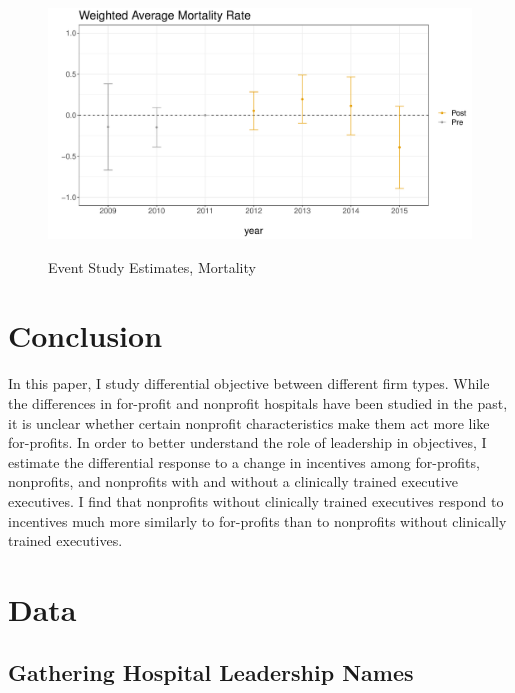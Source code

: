 \documentclass[12pt]{article}
\begin{document}
    \begin{figure}[ht!]
        \caption{Event Study Estimates, Mortality}
        \includegraphics[scale=.5]{Objects/mort_es_graph.pdf}
        \label{fig:wa_eventstudy_mort}
    \end{figure}

    \section{Conclusion}

    In this paper, I study differential objective between different firm types. While the differences in for-profit and nonprofit hospitals have been studied in the past, it is unclear whether certain nonprofit characteristics make them act more like for-profits. In order to better understand the role of leadership in objectives, I estimate the differential response to a change in incentives among for-profits, nonprofits, and nonprofits with and without a clinically trained executive executives. I find that nonprofits without clinically trained executives respond to incentives much more similarly to for-profits than to nonprofits without clinically trained executives.

	
	\newpage

    \printbibliography

\appendix

 \section{Data}\label{appendixdata}

\subsection{Gathering Hospital Leadership Names}
\end{document}

